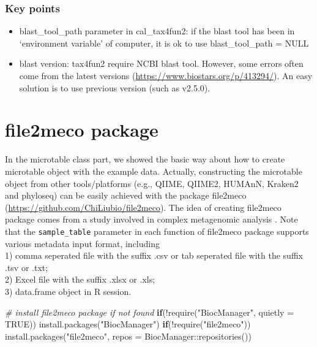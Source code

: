 \documentclass[
]{book}
\newenvironment{Shaded}{\begin{snugshade}}{\end{snugshade}}
\newcommand{\AttributeTok}[1]{\textcolor[rgb]{0.77,0.63,0.00}{#1}}
\newcommand{\CommentTok}[1]{\textcolor[rgb]{0.56,0.35,0.01}{\textit{#1}}}
\newcommand{\ConstantTok}[1]{\textcolor[rgb]{0.00,0.00,0.00}{#1}}
\newcommand{\ControlFlowTok}[1]{\textcolor[rgb]{0.13,0.29,0.53}{\textbf{#1}}}
\newcommand{\FunctionTok}[1]{\textcolor[rgb]{0.00,0.00,0.00}{#1}}
\newcommand{\NormalTok}[1]{#1}
\newcommand{\SpecialCharTok}[1]{\textcolor[rgb]{0.00,0.00,0.00}{#1}}
\newcommand{\StringTok}[1]{\textcolor[rgb]{0.31,0.60,0.02}{#1}}
\providecommand{\tightlist}{%
  \setlength{\itemsep}{0pt}\setlength{\parskip}{0pt}}
\begin{document}
\hypertarget{key-points-10}{%
\subsection{Key points}\label{key-points-10}}

\begin{itemize}
\tightlist
\item
  blast\_tool\_path parameter in cal\_tax4fun2: if the blast tool has been in `environment variable' of computer, it is ok to use blast\_tool\_path = NULL
\item
  blast version: tax4fun2 require NCBI blast tool. However, some errors often come from the latest versions (\url{https://www.biostars.org/p/413294/}). An easy solution is to use previous version (such as v2.5.0).
\end{itemize}

\hypertarget{file2meco-package}{%
\chapter{file2meco package}\label{file2meco-package}}

In the microtable class part, we showed the basic way about how to create microtable object with the example data.
Actually, constructing the microtable object from other tools/platforms (e.g., QIIME, QIIME2, HUMAnN, Kraken2 and phyloseq)
can be easily achieved with the package file2meco (\url{https://github.com/ChiLiubio/file2meco}).
The idea of creating file2meco package comes from a study involved in complex metagenomic analysis \citep{Liu_Microbial_2022}.
Note that the \texttt{sample\_table} parameter in each function of file2meco package supports various metadata input format, including\\
1) comma seperated file with the suffix .csv or tab seperated file with the suffix .tsv or .txt;\\
2) Excel file with the suffix .xlsx or .xls;\\
3) data.frame object in R session.

\begin{Shaded}
\begin{Highlighting}[]
\CommentTok{\# install file2meco package if not found}
\ControlFlowTok{if}\NormalTok{(}\SpecialCharTok{!}\FunctionTok{require}\NormalTok{(}\StringTok{"BiocManager"}\NormalTok{, }\AttributeTok{quietly =} \ConstantTok{TRUE}\NormalTok{)) }\FunctionTok{install.packages}\NormalTok{(}\StringTok{"BiocManager"}\NormalTok{)}
\ControlFlowTok{if}\NormalTok{(}\SpecialCharTok{!}\FunctionTok{require}\NormalTok{(}\StringTok{"file2meco"}\NormalTok{)) }\FunctionTok{install.packages}\NormalTok{(}\StringTok{"file2meco"}\NormalTok{, }\AttributeTok{repos =}\NormalTok{ BiocManager}\SpecialCharTok{::}\FunctionTok{repositories}\NormalTok{())}
\end{Highlighting}
\end{Shaded}
\end{document}
